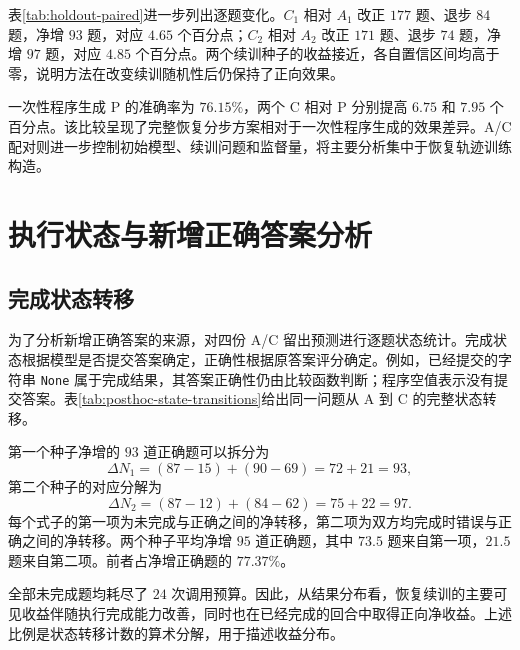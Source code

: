 \begin{table}[htbp]
  \centering
  \caption{项目留出集配对差异。区间单位为百分点。}
  \label{tab:holdout-paired}
  \PublicPairedTable
\end{table}

表\ref{tab:holdout-paired}进一步列出逐题变化。$C_1$ 相对 $A_1$ 改正 $177$ 题、退步 $84$ 题，净增 $93$ 题，对应 $4.65$ 个百分点；$C_2$ 相对 $A_2$ 改正 $171$ 题、退步 $74$ 题，净增 $97$ 题，对应 $4.85$ 个百分点。两个续训种子的收益接近，各自置信区间均高于零，说明方法在改变续训随机性后仍保持了正向效果。

一次性程序生成 P 的准确率为 $76.15\%$，两个 C 相对 P 分别提高 $6.75$ 和 $7.95$ 个百分点。该比较呈现了完整恢复分步方案相对于一次性程序生成的效果差异。A/C 配对则进一步控制初始模型、续训问题和监督量，将主要分析集中于恢复轨迹训练构造。

\section{执行状态与新增正确答案分析}

\subsection{完成状态转移}

为了分析新增正确答案的来源，对四份 A/C 留出预测进行逐题状态统计。完成状态根据模型是否提交答案确定，正确性根据原答案评分确定。例如，已经提交的字符串 \texttt{None} 属于完成结果，其答案正确性仍由比较函数判断；程序空值表示没有提交答案。表\ref{tab:posthoc-state-transitions}给出同一问题从 A 到 C 的完整状态转移。

\begin{table}[htbp]
\centering
\caption{A 到 C 的逐题状态转移；每个种子覆盖同一批两千题}
\label{tab:posthoc-state-transitions}
\PublicTransitionTable
\end{table}

第一个种子净增的 $93$ 道正确题可以拆分为
\begin{equation}
  \Delta N_1=(87-15)+(90-69)=72+21=93,
\end{equation}
第二个种子的对应分解为
\begin{equation}
  \Delta N_2=(87-12)+(84-62)=75+22=97.
\end{equation}
每个式子的第一项为未完成与正确之间的净转移，第二项为双方均完成时错误与正确之间的净转移。两个种子平均净增 $95$ 道正确题，其中 $73.5$ 题来自第一项，$21.5$ 题来自第二项。前者占净增正确题的 $77.37\%$。

全部未完成题均耗尽了 $24$ 次调用预算。因此，从结果分布看，恢复续训的主要可见收益伴随执行完成能力改善，同时也在已经完成的回合中取得正向净收益。上述比例是状态转移计数的算术分解，用于描述收益分布。

